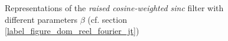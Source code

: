 	
	\label{label_figure_dom_reel_fourier_jt}
	\begin{figure}
		\centering
		\caption{Representations of the \emph{raised cosine-weighted sinc} filter with different parameters $\beta$ (cf. section \ref{label_figure_dom_reel_fourier_jt})}
		\label{szeliski_plotRaisedCosine}
	\end{figure}
	
